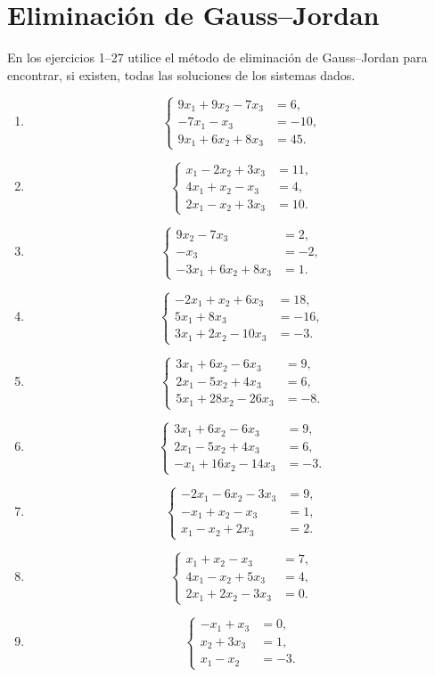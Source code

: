 \documentclass[12pt]{article}
\theoremstyle{remark}
\newcommand{\sistema}[1]{%
\[
\left\{
\begin{aligned}
#1
\end{aligned}
\right.
\]
}
\begin{document}
\section{Eliminación de Gauss--Jordan}

En los ejercicios 1--27 utilice el método de eliminación de Gauss--Jordan para encontrar,
si existen, todas las soluciones de los sistemas dados.

\begin{enumerate}[label=\textbf{\arabic*.},leftmargin=*]

\item \sistema{
9x_1+9x_2-7x_3&=6,\\
-7x_1-x_3&=-10,\\
9x_1+6x_2+8x_3&=45.
}

\item \sistema{
x_1-2x_2+3x_3&=11,\\
4x_1+x_2-x_3&=4,\\
2x_1-x_2+3x_3&=10.
}

\item \sistema{
9x_2-7x_3&=2,\\
-x_3&=-2,\\
-3x_1+6x_2+8x_3&=1.
}

\item \sistema{
-2x_1+x_2+6x_3&=18,\\
5x_1+8x_3&=-16,\\
3x_1+2x_2-10x_3&=-3.
}

\item \sistema{
3x_1+6x_2-6x_3&=9,\\
2x_1-5x_2+4x_3&=6,\\
5x_1+28x_2-26x_3&=-8.
}

\item \sistema{
3x_1+6x_2-6x_3&=9,\\
2x_1-5x_2+4x_3&=6,\\
-x_1+16x_2-14x_3&=-3.
}

\item \sistema{
-2x_1-6x_2-3x_3&=9,\\
-x_1+x_2-x_3&=1,\\
x_1-x_2+2x_3&=2.
}

\item \sistema{
x_1+x_2-x_3&=7,\\
4x_1-x_2+5x_3&=4,\\
2x_1+2x_2-3x_3&=0.
}

\item \sistema{
-x_1+x_3&=0,\\
x_2+3x_3&=1,\\
x_1-x_2&=-3.
}


\end{enumerate}
\end{document}
